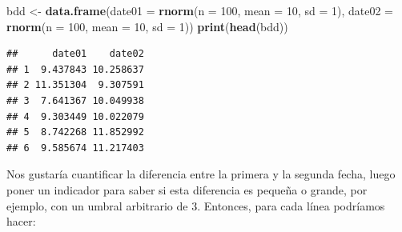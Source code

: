 \documentclass[
]{book}
\newenvironment{Shaded}{\begin{snugshade}}{\end{snugshade}}
\newcommand{\DataTypeTok}[1]{\textcolor[rgb]{0.13,0.29,0.53}{#1}}
\newcommand{\DecValTok}[1]{\textcolor[rgb]{0.00,0.00,0.81}{#1}}
\newcommand{\KeywordTok}[1]{\textcolor[rgb]{0.13,0.29,0.53}{\textbf{#1}}}
\newcommand{\NormalTok}[1]{#1}
\newcommand{\StringTok}[1]{\textcolor[rgb]{0.31,0.60,0.02}{#1}}
\begin{document}
\begin{Shaded}
\begin{Highlighting}[]
\NormalTok{bdd <-}\StringTok{ }\KeywordTok{data.frame}\NormalTok{(}\DataTypeTok{date01 =} \KeywordTok{rnorm}\NormalTok{(}\DataTypeTok{n =} \DecValTok{100}\NormalTok{, }\DataTypeTok{mean =} \DecValTok{10}\NormalTok{, }\DataTypeTok{sd =} \DecValTok{1}\NormalTok{), }
                  \DataTypeTok{date02 =} \KeywordTok{rnorm}\NormalTok{(}\DataTypeTok{n =} \DecValTok{100}\NormalTok{, }\DataTypeTok{mean =} \DecValTok{10}\NormalTok{, }\DataTypeTok{sd =} \DecValTok{1}\NormalTok{))}
\KeywordTok{print}\NormalTok{(}\KeywordTok{head}\NormalTok{(bdd))}
\end{Highlighting}
\end{Shaded}

\begin{verbatim}
##      date01    date02
## 1  9.437843 10.258637
## 2 11.351304  9.307591
## 3  7.641367 10.049938
## 4  9.303449 10.022079
## 5  8.742268 11.852992
## 6  9.585674 11.217403
\end{verbatim}

Nos gustaría cuantificar la diferencia entre la primera y la segunda fecha, luego poner un indicador para saber si esta diferencia es pequeña o grande, por ejemplo, con un umbral arbitrario de 3. Entonces, para cada línea podríamos hacer:
\end{document}
